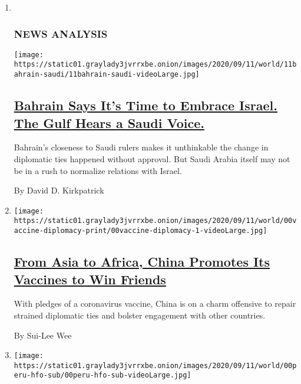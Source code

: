\begin{enumerate}
\def\labelenumi{\arabic{enumi}.}
\item ~
  \hypertarget{news-analysis}{%
  \subsubsection{NEWS ANALYSIS}\label{news-analysis}}

  \texttt{[image: https://static01.graylady3jvrrxbe.onion/images/2020/09/11/world/11bahrain-saudi/11bahrain-saudi-videoLarge.jpg]}

  \hypertarget{bahrain-says-its-time-to-embrace-israel-the-gulf-hears-a-saudi-voice}{%
  \subsection{\texorpdfstring{\href{/2020/09/11/world/middleeast/bahrain-israel-saudi-arabia.html}{Bahrain
  Says It's Time to Embrace Israel. The Gulf Hears a Saudi
  Voice.}}{Bahrain Says It's Time to Embrace Israel. The Gulf Hears a Saudi Voice.}}\label{bahrain-says-its-time-to-embrace-israel-the-gulf-hears-a-saudi-voice}}

  Bahrain's closeness to Saudi rulers makes it unthinkable the change in
  diplomatic ties happened without approval. But Saudi Arabia itself may
  not be in a rush to normalize relations with Israel.

  By David D. Kirkpatrick
\item
  \texttt{[image: https://static01.graylady3jvrrxbe.onion/images/2020/09/11/world/00vaccine-diplomacy-print/00vaccine-diplomacy-1-videoLarge.jpg]}

  \hypertarget{from-asia-to-africa-china-promotes-its-vaccines-to-win-friends}{%
  \subsection{\texorpdfstring{\href{/2020/09/11/business/china-vaccine-diplomacy.html}{From
  Asia to Africa, China Promotes Its Vaccines to Win
  Friends}}{From Asia to Africa, China Promotes Its Vaccines to Win Friends}}\label{from-asia-to-africa-china-promotes-its-vaccines-to-win-friends}}

  With pledges of a coronavirus vaccine, China is on a charm offensive
  to repair strained diplomatic ties and bolster engagement with other
  countries.

  By Sui-Lee Wee
\item
  \texttt{[image: https://static01.graylady3jvrrxbe.onion/images/2020/09/11/world/00peru-hfo-sub/00peru-hfo-sub-videoLarge.jpg]}


\end{enumerate}
